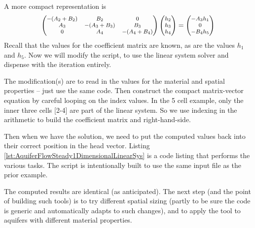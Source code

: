  A more compact representation is
 \begin{displaymath}
\footnotesize
\begin{pmatrix}
-(A_2+B_2)  & B_2 & 0 \\
A_3 & -(A_3+B_3) & B_3 \\
0 & A_4 & -(A_4+B_4) \\
 \end{pmatrix}
 \begin{pmatrix}
 h_2 \\ h_3 \\ h_4 \\
 \end{pmatrix}
 =
  \begin{pmatrix}
 -A_3  h_1 \\ 0 \\ - B_4  h_5 \\
 \end{pmatrix}
 \normalsize
 \end{displaymath}
 Recall that the values for the coefficient matrix are known, as are the values $h_1$ and $h_5$.
 Now we will modify the script, to use the linear system solver and dispense with the iteration entirely.
 
 The modification(s) are to read in the values for the material and spatial properties -- just use the same code.  
 Then construct the compact matrix-vector equation by careful looping on the index values. 
 In the 5 cell example, only the inner three cells [2-4] are part of the linear system. 
 So we use indexing in the arithmetic to build the coefficient matrix and right-hand-side.
 
 Then when we have the solution, we need to put the computed values back into their correct position in the head vector.
 Listing \ref{lst:AquiferFlowSteady1DimensionalLinearSys} is a code listing that performs the various tasks.
 The script is intentionally built to use the same input file as the prior example. 
 
 The computed results are identical (as anticipated).  
 The next step (and the point of building such tools) is to try different spatial sizing (partly to be sure the code is generic and automatically adapts to such changes), and to apply the tool to aquifers with different material properties.

